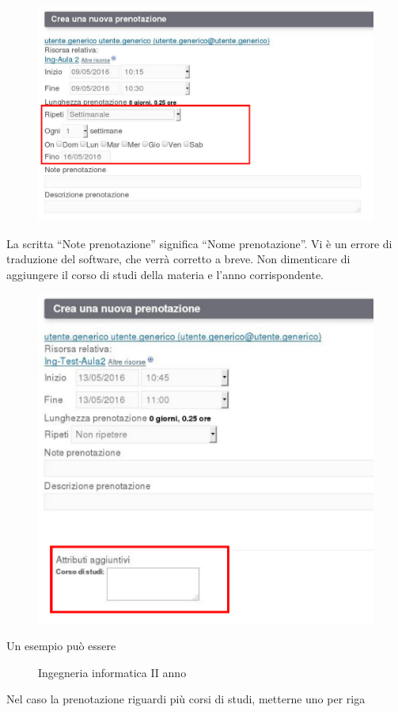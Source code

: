 \begin{figure}[H]
\centering{}\includegraphics[scale=0.5]{Immagini/prenotazione_ripetizione_2.pdf}
\normalsize
\caption{}
\label{fig:prenotazione_ripetizione_2.pdf}
\end{figure}


La scritta ``Note prenotazione'' significa ``Nome prenotazione''. Vi è un errore di traduzione
del software, che verrà corretto a breve.
Non dimenticare di aggiungere il corso di studi della materia e l'anno corrispondente.


\begin{figure}[H]
\centering{}\includegraphics[scale=0.5]{Immagini/prenotazione_attributi.pdf}
\normalsize
\caption{}
\label{fig:prenotazione_attributi.pdf}
\end{figure}

Un esempio può essere

\begin{figure}[H]
 \centering{} Ingegneria informatica II anno
\normalsize
\end{figure}

Nel caso la prenotazione riguardi più corsi di studi, metterne uno per riga
